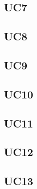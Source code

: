 \subsection{UC7}
\subsection{UC8}
\subsection{UC9}
\subsection{UC10}
\subsection{UC11}
\subsection{UC12}
\subsection{UC13}
